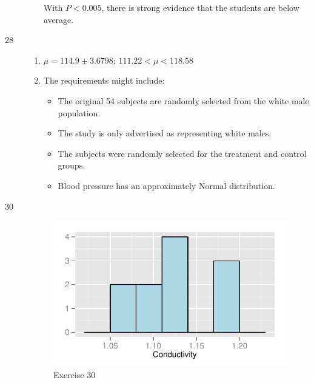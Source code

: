 \documentclass[letterpaper, landscape]{exam}
\begin{document}
\begin{description}
\begin{enumerate}[label = (\alph*)]
            With $P < 0.005$, there is strong evidence that the students are below
            average.

        \end{enumerate}

      \item[28]
        \begin{enumerate}[label = (\alph*)]
          \item $\mu = 114.9 \pm 3.6798$; $111.22 < \mu < 118.58$

          \item
            The requirements might include:
            \begin{itemize}
              \item The original 54 subjects are randomly selected from the
                white male population.

              \item The study is only advertised as representing white males.

              \item The subjects were randomly selected for the treatment and
                control groups.

              \item Blood pressure has an approximately Normal distribution.
            \end{itemize}

        \end{enumerate}

      \item[30]
        \begin{figure}[H]
          \centering
          \includegraphics[scale = 1.0]{figures/ex30.pdf}
          \caption{Exercise 30}\label{fig:ex30}
        \end{figure}
        

\end{description}
\end{document}
